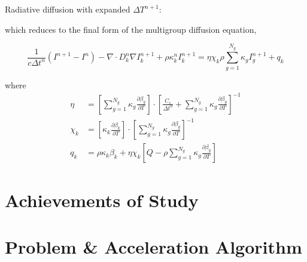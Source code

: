 \documentclass{beamer}
\begin{document}
\begin{frame}
    Radiative diffusion with expanded $\Delta T^{n+1}$:

    which reduces to the final form of the multigroup diffusion equation,

\begin{equation}\label{eq:standard_diffusion}
  \frac{1}{c \Delta t^n}\left( I^{n+1} - I^n \right)- \nabla \cdot D_k^n \nabla I_k^{n+1} + \rho \kappa_k^n I_k^{n+1} = \eta \chi_k \rho \sum_{g=1}^{N_g}\kappa_g I_g^{n+1} + q_k
\end{equation}

where
\begin{subequations}
  \begin{align}
    \eta   &=  \left[\sum_{g=1}^{N_g}\kappa_g\frac{\partial \beta_g}{\partial T}\right] \cdot {\left[ \frac{C_v}{\Delta t^n} + \sum_{g=1}^{N_g}\kappa_g\frac{\partial \beta_g}{\partial T} \right]}^{-1} \\
    \chi_k &=  \left[ \kappa_k  \frac{\partial \beta_k}{\partial T}   \right] \cdot {\left[\sum_{g=1}^{N_g}\kappa_g\frac{\partial \beta_g}{\partial T}\right]}^{-1} \\
    q_k    &=  \rho \kappa_k \beta_k  +  \eta \chi_k \left[ Q - \rho \sum_{g=1}^{N_g}\kappa_g\frac{\partial \beta_g}{\partial T} \right]
  \end{align}
\end{subequations}



\end{frame}


\section{Achievements of Study}



\section{Problem \& Acceleration Algorithm}

\end{document}
